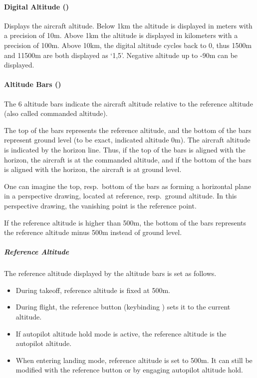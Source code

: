 \paragraph{Digital Altitude ()}
Displays the aircraft altitude.
Below 1km the altitude is displayed in meters with a precision of 10m.
Above 1km the altitude is displayed in kilometers with a precision of 100m.
Above 10km, the digital altitude cycles back to 0,
thus 1500m and 11500m are both displayed as `1,5'.
Negative altitude up to -90m can be displayed.

\paragraph{Altitude Bars ()}
The 6 altitude bars indicate the aircraft altitude relative to the reference altitude
(also called commanded altitude).

The top of the bars represents the reference altitude,
and the bottom of the bars represent ground level (to be exact, indicated altitude 0m).
The aircraft altitude is indicated by the horizon line.
Thus, if the top of the bars is aligned with the horizon, the aircraft is at the commanded altitude,
and if the bottom of the bars is aligned with the horizon, the aircraft is at ground level.

One can imagine the top, resp.\ bottom of the bars as forming a horizontal
plane in a perspective drawing, located at reference, resp.\ ground altitude.
In this perspective drawing, the vanishing point is the reference point.

If the reference altitude is higher than 500m,
the bottom of the bars represents the reference altitude minus 500m instead of ground level.

\subparagraph{Reference Altitude}
The reference altitude displayed by the altitude bars is set as follows.
\begin{itemize}[noitemsep]
  \item During takeoff, reference altitude is fixed at 500m.
  \item During flight, the reference button (keybinding ) 
    sets it to the current altitude.
  \item If autopilot altitude hold mode is active,
    the reference altitude is the autopilot altitude.
  \item When entering landing mode, reference altitude is set to 500m.
    It can still be modified with the reference button or by engaging autopilot altitude hold.
\end{itemize}

